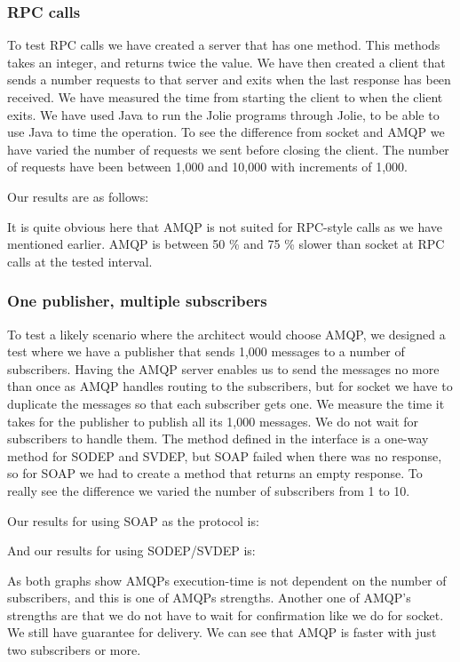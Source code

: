 \subsubsection{RPC calls}
To test RPC calls we have created a server that has one method. This methods takes an integer, and returns twice the value. We have then created a client that sends a number requests to that server and exits when the last response has been received. We have measured the time from starting the client to when the client exits. We have used Java to run the Jolie programs through Jolie, to be able to use Java to time the operation. To see the difference from socket and AMQP we have varied the number of requests we sent before closing the client. The number of requests have been between 1,000 and 10,000 with increments of 1,000.

Our results are as follows:


It is quite obvious here that AMQP is not suited for RPC-style calls as we have mentioned earlier. AMQP is between 50 \% and 75 \% slower than socket at RPC calls at the tested interval.

\subsubsection{One publisher, multiple subscribers}
To test a likely scenario where the architect would choose AMQP, we designed a test where we have a publisher that sends 1,000 messages to a number of subscribers. Having the AMQP server enables us to send the messages no more than once as AMQP handles routing to the subscribers, but for socket we have to duplicate the messages so that each subscriber gets one. We measure the time it takes for the publisher to publish all its 1,000 messages. We do not wait for subscribers to handle them. The method defined in the interface is a one-way method for SODEP and SVDEP, but SOAP failed when there was no response, so for SOAP we had to create a method that returns an empty response. To really see the difference we varied the number of subscribers from 1 to 10.

Our results for using SOAP as the protocol is:



And our results for using SODEP/SVDEP is:



As both graphs show AMQPs execution-time is not dependent on the number of subscribers, and this is one of AMQPs strengths. Another one of AMQP's strengths are that we do not have to wait for confirmation like we do for socket. We still have guarantee for delivery. We can see that AMQP is faster with just two subscribers or more.
